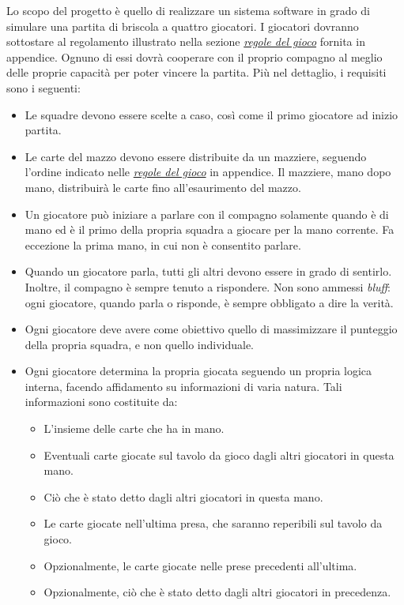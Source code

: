 \documentclass[a4paper,12pt]{article}
\begin{document}
Lo scopo del progetto è quello di realizzare un sistema software in grado di simulare una partita di briscola a quattro giocatori. I giocatori dovranno sottostare al regolamento illustrato nella sezione \emph{\hyperref[briscola-rules]{regole del gioco}} fornita in appendice. Ognuno di essi dovrà cooperare con il proprio compagno al meglio delle proprie capacità per poter vincere la partita. Più nel dettaglio, i requisiti sono i seguenti:
\begin{itemize}
	\item Le squadre devono essere scelte a caso, così come il primo giocatore ad inizio partita.
	\item Le carte del mazzo devono essere distribuite da un mazziere, seguendo l'ordine indicato nelle \emph{\hyperref[briscola-rules]{regole del gioco}} in appendice. Il mazziere, mano dopo mano, distribuirà le carte fino all'esaurimento del mazzo.
	\item Un giocatore può iniziare a parlare con il compagno solamente quando è di mano ed è il primo della propria squadra a giocare per la mano corrente. Fa eccezione la prima mano, in cui non è consentito parlare.
	\item Quando un giocatore parla, tutti gli altri devono essere in grado di sentirlo. Inoltre, il compagno è sempre tenuto a rispondere.  Non sono ammessi \emph{bluff}: ogni giocatore, quando parla o risponde, è sempre obbligato a dire la verità.
	\item Ogni giocatore deve avere come obiettivo quello di massimizzare il punteggio della propria squadra, e non quello individuale.
	\item Ogni giocatore determina la propria giocata seguendo un propria logica interna, facendo affidamento su informazioni di varia natura. Tali informazioni sono costituite da:
	\begin{itemize}
		\item L'insieme delle carte che ha in mano.
		\item Eventuali carte giocate sul tavolo da gioco dagli altri giocatori in questa mano.
		\item Ciò che è stato detto dagli altri giocatori in questa mano.
		\item Le carte giocate nell'ultima presa, che saranno reperibili sul tavolo da gioco.
		\item Opzionalmente, le carte giocate nelle prese precedenti all'ultima.
		\item Opzionalmente, ciò che è stato detto dagli altri giocatori in precedenza.
	\end{itemize}
\end{itemize}
\end{document}
